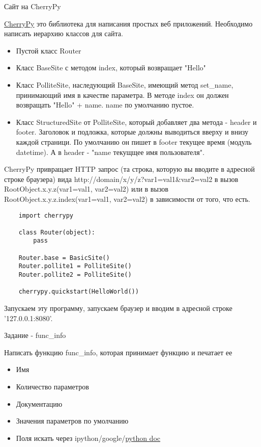 \documentclass{article}
\begin{document}
\begin{center}Сайт на CherryPy\end{center}
\href{http://www.cherrypy.org/}{CherryPy} это библиотека для написания простых веб приложений.
Необходимо написать иерархию классов для сайта. 
\begin{itemize}
    \item Пустой класс Router
    \item Класс BaseSite с методом index, который возвращает "Hello"
    \item Класс PolliteSite, наследующий BaseSite, имеющий метод set\_name,
            принимающий имя в качестве параметра.
            В методе index он должен возвращать "Hello" + name. name по умолчанию пустое.
    \item Класс StructuredSite от PolliteSite, который добавляет два метода - header и footer.
          Заголовок и подложка, которые должны выводиться вверху и внизу каждой страници.
          По умолчанию он пишет в footer текущее время (модуль datetime). А в header - 
          "name {текущщее имя пользователя}".

\end{itemize}

CherryPy привращает HTTP запрос (та строка, которую вы вводите в адресной строке браузера)
вида http://domain/x/y/z?var1=val1\&var2=val2
в вызов RootObject.x.y.z(var1=val1, var2=val2) или в вызов \\
RootObject.x.y.z.index(var1=val1, var2=val2) в зависимости от того, что есть.

\begin{lstlisting}
    import cherrypy

    class Router(object):
        pass

    Router.base = BasicSite()
    Router.pollite1 = PolliteSite()
    Router.pollite2 = PolliteSite()

    cherrypy.quickstart(HelloWorld())
\end{lstlisting}

Запускаем эту программу, запускаем браузер и вводим в адресной строке '127.0.0.1:8080'.

\newpage

\begin{center} Задание - func\_info \end{center}
    Написать функцию func\_info, которая принимает функцию и печатает ее
    \begin{itemize}
        \item Имя
        \item Количество параметров
        \item Документацию
        \item Значения параметров по умолчанию
        \item Поля искать через ipython/google/\href{http://docs.python.org/reference/datamodel.html}{python doc}
    \end{itemize}
\newpage
\end{document}

